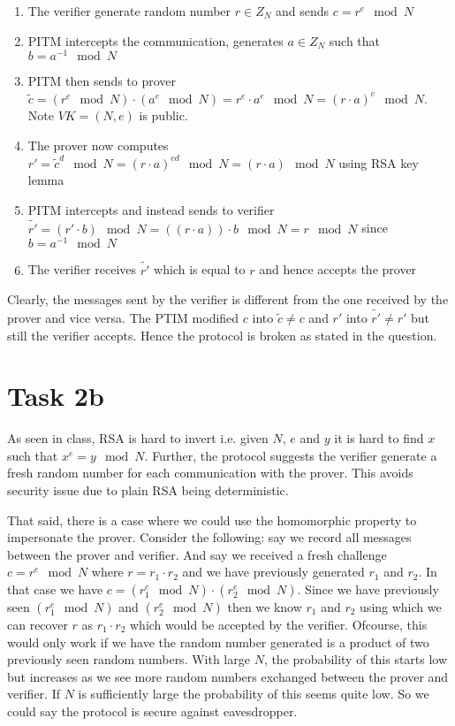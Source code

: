 \documentclass{article}
\begin{document}
    \begin{enumerate}
        \item The verifier generate random number $r \in Z_N$ and sends $c = r^e \mod N$
        \item PITM intercepts the communication, generates $a \in Z_N$ such that $b = a^{-1} \mod N$
        \item PITM then sends to prover $\widetilde{c} = (r^e \mod N) \cdot (a^e \mod N) = r^e \cdot a^e \mod N = (r \cdot a)^e \mod N$. Note $VK = (N, e)$ is public.
        \item The prover now computes $r' = \widetilde{c}^d \mod N = (r \cdot a)^{ed} \mod N = (r \cdot a) \mod N$ using RSA key lemma
        \item PITM intercepts and instead sends to verifier $\widetilde{r'} = (r' \cdot b) \mod N = ((r \cdot a)) \cdot b \mod N = r \mod N$ since $b = a^{-1} \mod N$
        \item The verifier receives $\widetilde{r'}$ which is equal to $r$ and hence accepts the prover
    \end{enumerate}

    Clearly, the messages sent by the verifier is different from the one received by the prover and vice versa. The PTIM modified $c$ into $\widetilde{c} \ne c$ and $r'$ into $\widetilde{r'} \ne r'$ but still the verifier accepts. Hence the protocol is broken as stated in the question.

    \section*{Task 2b}
    As seen in class, RSA is hard to invert i.e. given $N$, $e$ and $y$ it is hard to find $x$ such that $x^e = y \mod N$. Further, the protocol suggests the verifier generate a fresh random number for each communication with the prover. This avoids security issue due to plain RSA being deterministic.

    That said, there is a case where we could use the homomorphic property to impersonate the prover. Consider the following: say we record all messages between the prover and verifier. And say we received a fresh challenge $c = r^e \mod N$ where $r = r_1 \cdot r_2$ and we have previously generated $r_1$ and $r_2$. In that case we have $c = (r_1^e \mod N) \cdot (r_2^e \mod N)$. Since we have previously seen $(r_1^e \mod N)$ and $(r_2^e \mod N)$ then we know $r_1$ and $r_2$ using which we can recover $r$ as $r_1 \cdot r_2$ which would be accepted by the verifier. Ofcourse, this would only work if we have the random number generated is a product of two previously seen random numbers. With large $N$, the probability of this starts low but increases as we see more random numbers exchanged between the prover and verifier. If $N$ is sufficiently large the probability of this seems quite low. So we could say the protocol is secure against eavesdropper.
\end{document}
